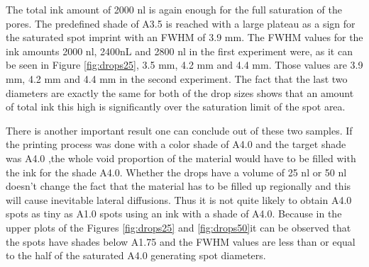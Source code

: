  The total ink amount of 2000 nl is again enough for the full saturation of the pores. The predefined shade of A3.5 is reached with a large plateau as a sign for the saturated spot imprint with an FWHM of 3.9 mm. The FWHM values for the ink amounts 2000 nl, 2400nL and 2800 nl in the first experiment were, as it can be seen in Figure \ref{fig:drops25}, 3.5 mm, 4.2 mm and 4.4 mm. Those values are 3.9 mm, 4.2 mm and 4.4 mm in the second experiment. The fact that the last two diameters are exactly the same for both of the drop sizes shows that an amount of total ink this high is significantly over the saturation limit of the spot area. 
 
 There is another important result one can conclude out of these two samples. If the printing process was done with a color shade of A4.0 and the target shade was A4.0 ,the whole void proportion of the material would have to be filled with the ink for the shade A4.0. Whether the drops have a volume of 25 nl or 50 nl doesn't change the fact that the material has to be filled up regionally and this will cause inevitable  lateral diffusions. Thus it is not quite likely to obtain A4.0 spots as tiny as A1.0 spots using an ink with a shade of A4.0. Because in the upper plots of the Figures \ref{fig:drops25} and \ref{fig:drops50}it can be observed that the spots have shades below A1.75 and the FWHM values are less than or equal to the half of the saturated A4.0 generating spot diameters.
